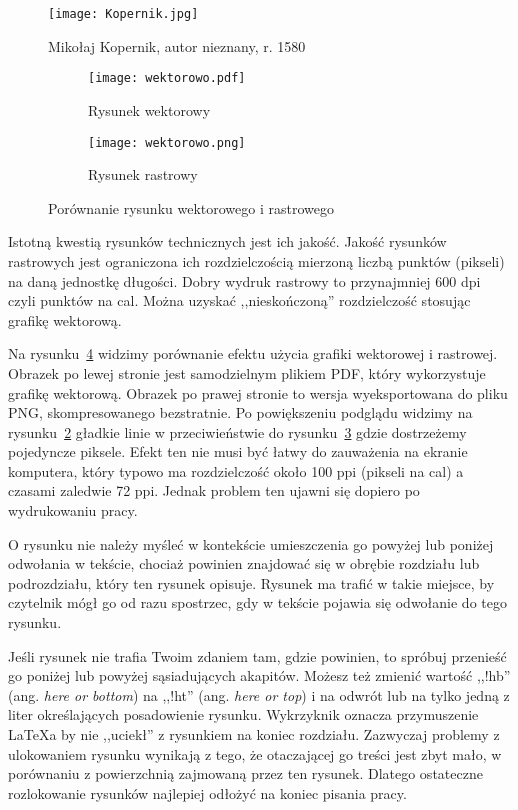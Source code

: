 \begin{figure}[!hb]
	\centering \texttt{[image: Kopernik.jpg]}
	\caption{Mikołaj Kopernik, autor nieznany, r. 1580}
	\label{rys:kopernik}
\end{figure}

\begin{figure}
\centering
\begin{subfigure}{.5\textwidth}
  \centering
  \texttt{[image: wektorowo.pdf]}
  \caption{Rysunek wektorowy}
  \label{rys:wektorowopdf}
\end{subfigure}%
\begin{subfigure}{.5\textwidth}
  \centering
  \texttt{[image: wektorowo.png]}
  \caption{Rysunek rastrowy}
  \label{rys:wektorowopng}
\end{subfigure}
\caption{Porównanie rysunku wektorowego i rastrowego}
\label{rys:wektorowo}
\end{figure}

Istotną kwestią rysunków technicznych jest ich jakość. Jakość rysunków rastrowych jest ograniczona ich rozdzielczością mierzoną liczbą punktów (pikseli) na daną jednostkę długości. Dobry wydruk rastrowy to przynajmniej 600 dpi czyli punktów na cal. Można uzyskać ,,nieskończoną'' rozdzielczość stosując grafikę wektorową.

Na rysunku~\ref{rys:wektorowo} widzimy porównanie efektu użycia grafiki wektorowej i rastrowej. Obrazek po lewej stronie jest samodzielnym plikiem PDF, który wykorzystuje grafikę wektorową. Obrazek po prawej stronie to wersja wyeksportowana do pliku PNG, skompresowanego bezstratnie. Po powiększeniu podglądu widzimy na rysunku~\ref{rys:wektorowopdf} gładkie linie w przeciwieństwie do rysunku~\ref{rys:wektorowopng} gdzie dostrzeżemy pojedyncze piksele. Efekt ten nie musi być łatwy do zauważenia na ekranie komputera, który typowo ma rozdzielczość około 100 ppi (pikseli na cal) a czasami zaledwie 72 ppi. Jednak problem ten ujawni się dopiero po wydrukowaniu pracy.

O rysunku nie należy myśleć w kontekście umieszczenia go powyżej lub poniżej odwołania w tekście, chociaż powinien znajdować się w obrębie rozdziału lub podrozdziału, który ten rysunek opisuje. Rysunek ma trafić w takie miejsce, by czytelnik mógł go od razu spostrzec, gdy w tekście pojawia się odwołanie do tego rysunku.

Jeśli rysunek nie trafia Twoim zdaniem tam, gdzie powinien, to spróbuj przenieść go poniżej lub powyżej sąsiadujących akapitów. Możesz też zmienić wartość ,,!hb'' (ang. \textit{here or bottom}) na ,,!ht'' (ang. \textit{here or top}) i na odwrót lub na tylko jedną z liter określających posadowienie rysunku. Wykrzyknik oznacza przymuszenie \LaTeX{a} by nie ,,uciekł'' z rysunkiem na koniec rozdziału. Zazwyczaj problemy z ulokowaniem rysunku wynikają z tego, że otaczającej go treści jest zbyt mało, w porównaniu z powierzchnią zajmowaną przez ten rysunek. Dlatego ostateczne rozlokowanie rysunków najlepiej odłożyć na koniec pisania pracy.

